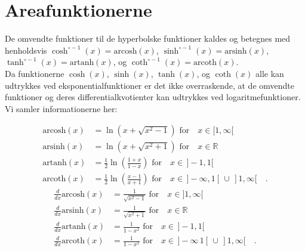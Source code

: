 
\section{Areafunktionerne}

De omvendte funktioner til de hyperbolske funktioner kaldes  og betegnes med henholdsvis
$\cosh^{\circ-1}(x) = \textrm{arcosh}(x)$, $\sinh^{\circ-1}(x) = \textrm{arsinh}(x)$, $\tanh^{\circ-1}(x) = \textrm{artanh}(x)$, og
$\coth^{\circ-1}(x) = \textrm{arcoth}(x)$.\\


Da funktionerne $\cosh(x)$, $\sinh(x)$, $\tanh(x)$, og $\coth(x)$ alle kan udtrykkes ved eksponentialfunktioner er det ikke overraskende, at de omvendte funktioner og deres differentialkvotienter kan udtrykkes ved logaritmefunktioner. Vi samler informationerne her:

\begin{equation}
\begin{aligned}
\textrm{arcosh}(x) &= \ln(x + \sqrt{x^{2} -1}) \, \, \textrm{for} \quad x \in [1, \infty[ \\
\textrm{arsinh}(x) &= \ln(x + \sqrt{x^{2} +1}) \, \, \textrm{for} \quad x \in \mathbb{R} \\
\textrm{artanh}(x) &= \frac{1}{2}\ln\left( \frac{1+x}{1-x}\right) \, \, \textrm{for} \quad x \in \, ]-1, 1[ \\
\textrm{arcoth}(x) &=\frac{1}{2}\ln\left( \frac{x-1}{x+1}\right) \, \, \textrm{for} \quad x \in \, ]-\infty , 1[ \,\cup \, ]1, \infty[ \quad .
\end{aligned}
\end{equation}
\begin{equation}
\begin{aligned}
\frac{d}{dx}\textrm{arcosh}(x) &=  \frac{1}{\sqrt{x^{2}-1}}   \, \, \textrm{for} \quad x \in ]1, \infty[ \\
\frac{d}{dx}\textrm{arsinh}(x) &=  \frac{1}{\sqrt{x^{2}+1}}   \, \, \textrm{for} \quad x \in \mathbb{R} \\
\frac{d}{dx}\textrm{artanh}(x) &=  \frac{1}{1 - x^{2}}   \, \, \textrm{for} \quad x \in  \, ]-1, 1[ \\
\frac{d}{dx}\textrm{arcoth}(x) &=  \frac{1}{1 - x^{2}}   \, \, \textrm{for} \quad x \in  \, ]-\infty\, 1[ \,\cup \, ]1, \infty[  \quad .
\end{aligned}
\end{equation}


